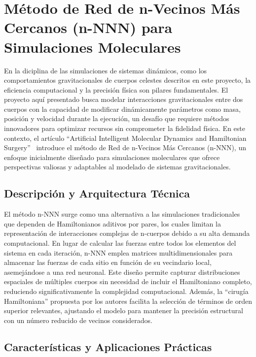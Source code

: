 \section[Método n-NNN]{Método de Red de n-Vecinos Más Cercanos (n-NNN) para Simulaciones Moleculares}%
\label{sec:state_of_the_art_03}

En la diciplina de las simulaciones de sistemas dinámicos, como los comportamientos gravitacionales de cuerpos celestes descritos en este proyecto, la eficiencia computacional y la precisión física son pilares fundamentales. El proyecto aquí presentado busca modelar interacciones gravitacionales entre dos cuerpos con la capacidad de modificar dinámicamente parámetros como masa, posición y velocidad durante la ejecución, un desafío que requiere métodos innovadores para optimizar recursos sin comprometer la fidelidad física. En este contexto, el artículo ``Artificial Intelligent Molecular Dynamics and Hamiltonian Surgery''~\cite{Maguire2005} introduce el método de Red de n-Vecinos Más Cercanos (n-NNN), un enfoque inicialmente diseñado para simulaciones moleculares que ofrece perspectivas valiosas y adaptables al modelado de sistemas gravitacionales.

\subsection{Descripción y Arquitectura Técnica}

El método n-NNN surge como una alternativa a las simulaciones tradicionales que dependen de Hamiltonianos aditivos por pares, los cuales limitan la representación de interacciones complejas de n-cuerpos debido a su alta demanda computacional. En lugar de calcular las fuerzas entre todos los elementos del sistema en cada iteración, n-NNN emplea matrices multidimensionales para almacenar las fuerzas de cada sitio en función de su vecindario local, asemejándose a una red neuronal. Este diseño permite capturar distribuciones espaciales de múltiples cuerpos sin necesidad de incluir el Hamiltoniano completo, reduciendo significativamente la complejidad computacional. Además, la ``cirugía Hamiltoniana'' propuesta por los autores facilita la selección de términos de orden superior relevantes, ajustando el modelo para mantener la precisión estructural con un número reducido de vecinos considerados.

\subsection{Características y Aplicaciones Prácticas}


